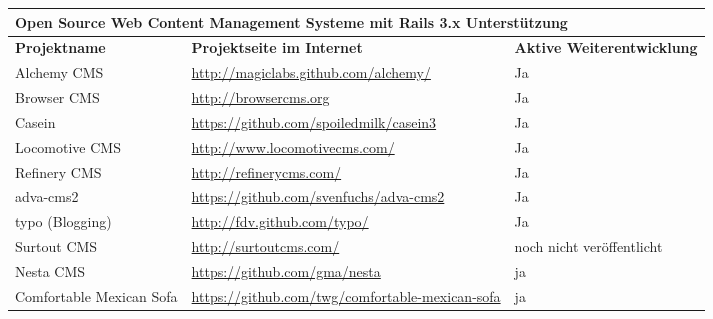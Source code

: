 \begin{table}
\center
\addtocounter{footnote}{1}
\begin{tabular}[]{|p{3cm}|p{8cm}|p{4cm}|}
\hline
\multicolumn{3}{|p{15cm}|}{\textbf{Open Source Web Content Management Systeme mit Rails 3.x Unterstützung}}\\
\hline
\textbf{Projektname}&\textbf{Projektseite im Internet}&\textbf{Aktive Weiterentwicklung}\\
\hline
\cellcolor{alicegrey}Alchemy CMS & \cellcolor{alicegrey} \href{http://magiclabs.github.com/alchemy/}{http://magiclabs.github.com/alchemy/} &\cellcolor{alicegrey} Ja \\
\hline
\cellcolor{alicegrey}Browser CMS & \cellcolor{alicegrey} \href{http://browsercms.org}{http://browsercms.org} & \cellcolor{alicegrey} Ja \\
\hline
Casein & \href{https://github.com/spoiledmilk/casein3}{https://github.com/spoiledmilk/casein3} & Ja \\
\hline
\cellcolor{alicegrey} Locomotive CMS & \cellcolor{alicegrey} \href{http://www.locomotivecms.com/}{http://www.locomotivecms.com/} & \cellcolor{alicegrey} Ja \\
\hline
\cellcolor{alicegrey} Refinery CMS & \cellcolor{alicegrey} \href{http://refinerycms.com/}{http://refinerycms.com/} & \cellcolor{alicegrey} Ja \\
\hline
adva-cms2 & \href{https://github.com/svenfuchs/adva-cms2}{https://github.com/svenfuchs/adva-cms2} & Ja \\
\hline
typo (Blogging) & \href{http://fdv.github.com/typo/}{http://fdv.github.com/typo/} & Ja \\
\hline
Surtout CMS & \href{http://surtoutcms.com/}{http://surtoutcms.com/} & noch nicht veröffentlicht \\
\hline
Nesta CMS & \href{https://github.com/gma/nesta}{https://github.com/gma/nesta} & ja  \\
\hline
Comfortable Mexican Sofa & \href{https://github.com/twg/comfortable-mexican-sofa}{https://github.com/twg/comfortable-mexican-sofa} & ja  \\
\hline
\end{tabular}
\end{table}

